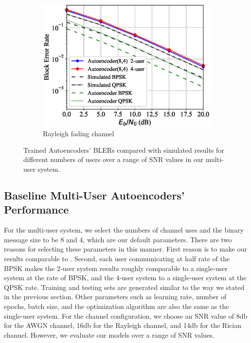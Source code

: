 \begin{figure}[!tp]
\begin{subfigure}{0.28\linewidth}
		\includegraphics[width=\linewidth]{figs/multi_autoencoder_bler_rayleigh}
		\caption{Rayleigh fading channel}	
	\end{subfigure}
	\caption{Trained Autoencoders' BLERs compared with simulated results for different numbers of users over a range of SNR values in our multi-user system.}
	\label{fig:multi_autoencoder_bler}
\end{figure}

\subsection{Baseline Multi-User Autoencoders' Performance}
For the multi-user system, we select the numbers of channel uses and the binary message size to be 8 and 4, which are our default parameters. There are two reasons for selecting these parameters in this manner. First reason is to make our results comparable to \cite{o2017introduction}. Second, each user communicating at half rate of the BPSK makes the 2-user system results roughly comparable to a single-user system at the rate of BPSK, and the 4-user system to a single-user system at the QPSK rate. Training and testing sets are generated similar to the way we stated in the previous section. Other parameters such as learning rate, number of epochs, batch size, and the optimization algorithm are also the same as the single-user system. For the channel configuration, we choose an SNR value of 8db for the AWGN channel, 16db for the Rayleigh channel, and 14db for the Rician channel. However, we evaluate our models over a range of SNR values.

